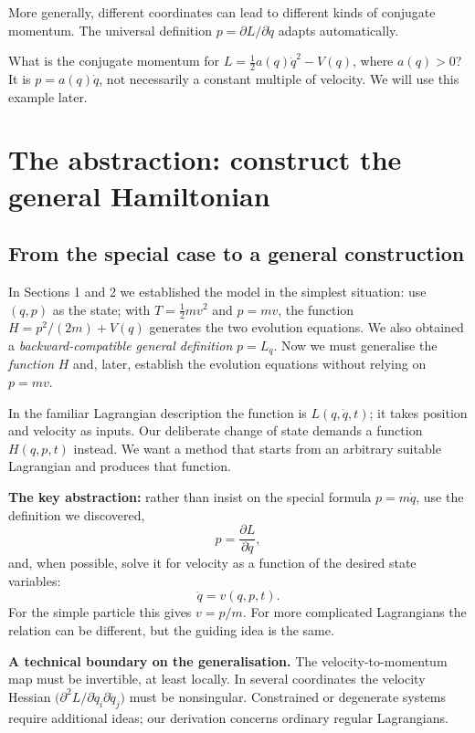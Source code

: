 \documentclass[11pt,a4paper,oneside]{article}
\newcommand{\pd}[2]{\frac{\partial #1}{\partial #2}}
\begin{document}
More generally, different coordinates can lead to different kinds of conjugate momentum. The universal definition $p=\partial L/\partial\dot q$ adapts automatically.

\begin{pausebox}
What is the conjugate momentum for $L=\tfrac12a(q)\dot q^2-V(q)$, where $a(q)>0$? It is $p=a(q)\dot q$, not necessarily a constant multiple of velocity. We will use this example later.
\end{pausebox}

\section{The abstraction: construct the general Hamiltonian}
\subsection{From the special case to a general construction}
\begin{intuition}[title={\strut Our generalisation project}]
In Sections 1 and 2 we established the model in the simplest situation: use $(q,p)$ as the state; with $T=\tfrac12mv^2$ and $p=mv$, the function $H=p^2/(2m)+V(q)$ generates the two evolution equations. We also obtained a \emph{backward-compatible general definition} $p=L_{\dot q}$. Now we must generalise the \emph{function} $H$ and, later, establish the evolution equations without relying on $p=mv$.
\end{intuition}
In the familiar Lagrangian description the function is $L(q,\dot q,t)$; it takes position and velocity as inputs. Our deliberate change of state demands a function $H(q,p,t)$ instead. We want a method that starts from an arbitrary suitable Lagrangian and produces that function.

\textbf{The key abstraction:} rather than insist on the special formula $p=m\dot q$, use the definition we discovered,
\[
 p=\pd{L}{\dot q},
\]
and, when possible, solve it for velocity as a function of the desired state variables:
\[
 \dot q=v(q,p,t).
\]
For the simple particle this gives $v=p/m$. For more complicated Lagrangians the relation can be different, but the guiding idea is the same.

\textbf{A technical boundary on the generalisation.} The velocity-to-momentum map must be invertible, at least locally. In several coordinates the velocity Hessian $\bigl(\partial^2L/\partial\dot q_i\partial\dot q_j\bigr)$ must be nonsingular. Constrained or degenerate systems require additional ideas; our derivation concerns ordinary regular Lagrangians.
\end{document}

